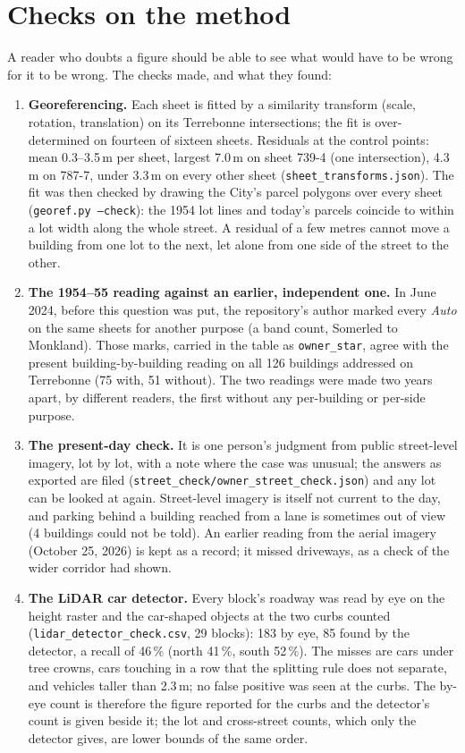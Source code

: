 \documentclass[11pt]{article}
\begin{document}
\section{Checks on the method}\label{sec:checks}
A reader who doubts a figure should be able to see what would have to be wrong for it to be wrong. The checks made, and what they found:
\begin{enumerate}
\item \textbf{Georeferencing.} Each sheet is fitted by a similarity transform (scale, rotation, translation) on its Terrebonne intersections; the fit is over-determined on fourteen of sixteen sheets. Residuals at the control points: mean 0.3--3.5\,m per sheet, largest 7.0\,m on sheet 739-4 (one intersection), 4.3\,m on 787-7, under 3.3\,m on every other sheet (\texttt{sheet\_transforms.json}). The fit was then checked by drawing the City's parcel polygons over every sheet (\texttt{georef.py --check}): the 1954 lot lines and today's parcels coincide to within a lot width along the whole street. A residual of a few metres cannot move a building from one lot to the next, let alone from one side of the street to the other.
\item \textbf{The 1954--55 reading against an earlier, independent one.} In June 2024, before this question was put, the repository's author marked every \emph{Auto} on the same sheets for another purpose (a band count, Somerled to Monkland). Those marks, carried in the table as \texttt{owner\_star}, agree with the present building-by-building reading on all 126 buildings addressed on Terrebonne (75 with, 51 without). The two readings were made two years apart, by different readers, the first without any per-building or per-side purpose.
\item \textbf{The present-day check.} It is one person's judgment from public street-level imagery, lot by lot, with a note where the case was unusual; the answers as exported are filed (\texttt{street\_check/owner\_street\_check.json}) and any lot can be looked at again. Street-level imagery is itself not current to the day, and parking behind a building reached from a lane is sometimes out of view (4 buildings could not be told). An earlier reading from the aerial imagery (October 25, 2026) is kept as a record; it missed driveways, as a check of the wider corridor had shown.
\item \textbf{The LiDAR car detector.} Every block's roadway was read by eye on the height raster and the car-shaped objects at the two curbs counted (\texttt{lidar\_detector\_check.csv}, 29 blocks): 183 by eye, 85 found by the detector, a recall of 46\,\% (north 41\,\%, south 52\,\%). The misses are cars under tree crowns, cars touching in a row that the splitting rule does not separate, and vehicles taller than 2.3\,m; no false positive was seen at the curbs. The by-eye count is therefore the figure reported for the curbs and the detector's count is given beside it; the lot and cross-street counts, which only the detector gives, are lower bounds of the same order.

\end{enumerate}
\end{document}
